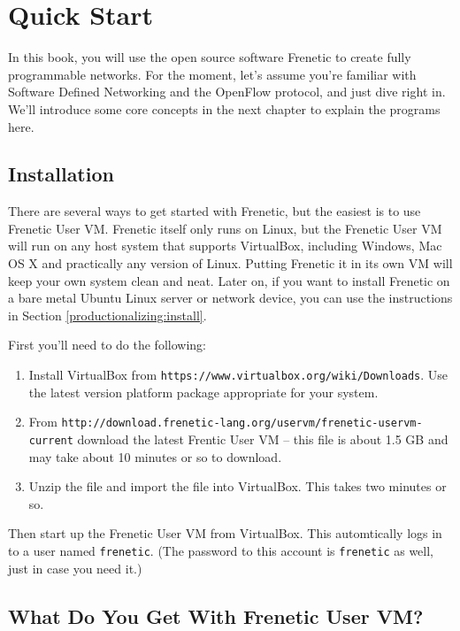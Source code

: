
\chapter{Quick Start}

In this book, you will use the open source software Frenetic to create fully programmable networks.  
For the moment, let's assume you're familiar with Software Defined Networking and the OpenFlow protocol, 
and just dive right in.    
We'll introduce some core concepts in the next chapter to explain the programs here.  

\section{Installation}

There are several ways to get started with Frenetic, but the easiest is to use Frenetic User VM.  
Frenetic itself only runs on Linux, but the Frenetic User VM will run on any host system that supports 
VirtualBox, including Windows, Mac OS X and practically any version of Linux.   
Putting Frenetic it in its own VM will keep your own system clean and neat.  
Later on, if you want to install Frenetic on a bare metal Ubuntu Linux server or network device, 
you can use the instructions in Section \ref{productionalizing:install}. 

First you'll need to do the following: 

\begin{enumerate}
\item Install VirtualBox from \texttt{https://www.virtualbox.org/wiki/Downloads}.  Use the latest version platform package appropriate for your system.  
\item From 
\texttt{http://download.frenetic-lang.org/uservm/frenetic-uservm-current}
download the latest Frentic User VM -- this file is about 1.5 GB and
may take about 10 minutes or so to download.  
\item Unzip the file and import the  file into VirtualBox.  This takes two minutes or
so.  
\end{enumerate}

Then start up the Frenetic User VM from VirtualBox.  This automtically logs in to a user named 
\texttt{frenetic}.  (The password to this account is \texttt{frenetic} as well, just in case you 
need it.)

\section{What Do You Get With Frenetic User VM?}


